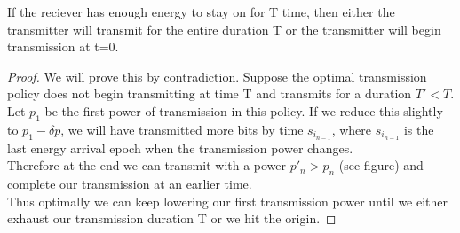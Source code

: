\begin{lemma}
If the reciever has enough energy to stay on for T time, then either the transmitter will transmit for the entire duration T or the transmitter will begin transmission at t=0.
\label{transimission_duration}
\end{lemma}
\begin{proof}
We will prove this by contradiction. Suppose the optimal transmission policy does not begin transmitting at time T and transmits for a duration $T' < T$.\\
Let $p_1$ be the first power of transmission in this policy. If we reduce this slightly to $p_1-\delta p$, we will have transmitted more bits by time $s_{i_{n-1}}$, where $s_{i_{n-1}}$ is the last energy arrival epoch when the transmission power changes. \\
Therefore at the end we can transmit with a power $p'_n > p_n$ (see figure) and complete our transmission at an earlier time.\\
Thus optimally we can keep lowering our first transmission power until we either exhaust our transmission duration T or we hit the origin.
\end{proof}


